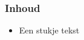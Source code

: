 \begin{frame}\frametitle{Inhoud}
    \begin{itemize}
        \item Een stukje tekst
    \end{itemize}
\end{frame}
